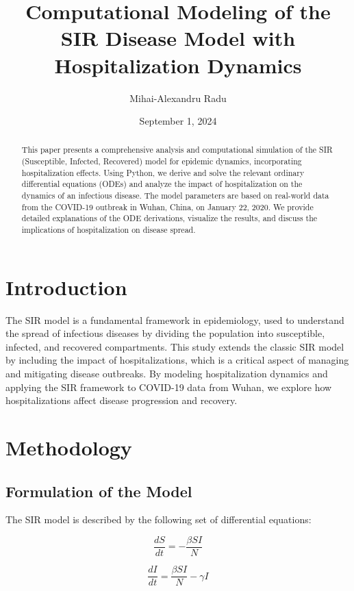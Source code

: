 \documentclass{article}
\title{Computational Modeling of the SIR Disease Model with Hospitalization Dynamics}
\author{Mihai-Alexandru Radu}
\date{September 1, 2024}  %
\begin{document}
\maketitle  %

\begin{abstract}
This paper presents a comprehensive analysis and computational simulation of the SIR (Susceptible, Infected, Recovered) model for epidemic dynamics, incorporating hospitalization effects. Using Python, we derive and solve the relevant ordinary differential equations (ODEs) and analyze the impact of hospitalization on the dynamics of an infectious disease. The model parameters are based on real-world data from the COVID-19 outbreak in Wuhan, China, on January 22, 2020. We provide detailed explanations of the ODE derivations, visualize the results, and discuss the implications of hospitalization on disease spread.
\end{abstract}

\section{Introduction}
The SIR model is a fundamental framework in epidemiology, used to understand the spread of infectious diseases by dividing the population into susceptible, infected, and recovered compartments. This study extends the classic SIR model by including the impact of hospitalizations, which is a critical aspect of managing and mitigating disease outbreaks. By modeling hospitalization dynamics and applying the SIR framework to COVID-19 data from Wuhan, we explore how hospitalizations affect disease progression and recovery.

\section{Methodology}

\subsection{Formulation of the Model}
The SIR model is described by the following set of differential equations:

\begin{equation}
\frac{dS}{dt} = -\frac{\beta S I}{N}
\end{equation}

\begin{equation}
\frac{dI}{dt} = \frac{\beta S I}{N} - \gamma I
\end{equation}
\end{document}
